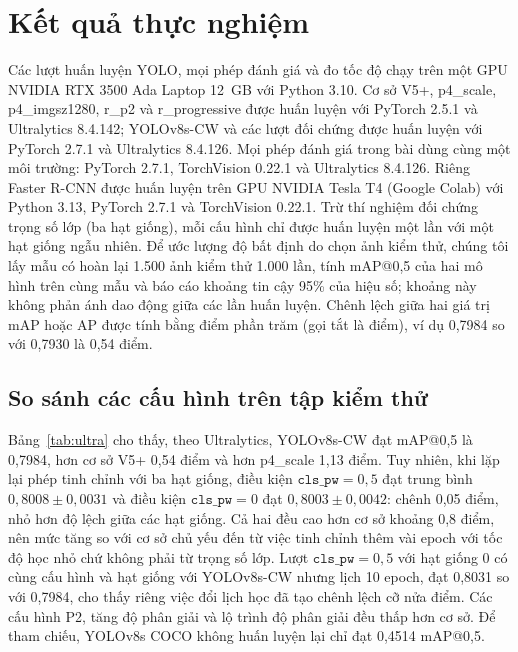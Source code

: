 \documentclass[10pt,journal,a4paper]{IEEEtran}
\newcommand{\clspw}{\texttt{cls\_pw}}
\begin{document}
\section{Kết quả thực nghiệm}\label{sec:results}
Các lượt huấn luyện YOLO, mọi phép đánh giá và đo tốc độ chạy trên một GPU NVIDIA RTX 3500 Ada Laptop 12~GB với Python 3.10. Cơ sở V5+, p4\_scale, p4\_imgsz1280, r\_p2 và r\_progressive được huấn luyện với PyTorch 2.5.1 và Ultralytics 8.4.142; YOLOv8s-CW và các lượt đối chứng được huấn luyện với PyTorch 2.7.1 và Ultralytics 8.4.126. Mọi phép đánh giá trong bài dùng cùng một môi trường: PyTorch 2.7.1, TorchVision 0.22.1 và Ultralytics 8.4.126. Riêng Faster R-CNN được huấn luyện trên GPU NVIDIA Tesla T4 (Google Colab) với Python 3.13, PyTorch 2.7.1 và TorchVision 0.22.1. Trừ thí nghiệm đối chứng trọng số lớp (ba hạt giống), mỗi cấu hình chỉ được huấn luyện một lần với một hạt giống ngẫu nhiên. Để ước lượng độ bất định do chọn ảnh kiểm thử, chúng tôi lấy mẫu có hoàn lại 1.500 ảnh kiểm thử 1.000 lần, tính mAP@0,5 của hai mô hình trên cùng mẫu và báo cáo khoảng tin cậy 95\% của hiệu số; khoảng này không phản ánh dao động giữa các lần huấn luyện. Chênh lệch giữa hai giá trị mAP hoặc AP được tính bằng điểm phần trăm (gọi tắt là điểm), ví dụ 0,7984 so với 0,7930 là 0,54 điểm.

\subsection{So sánh các cấu hình trên tập kiểm thử}
Bảng~\ref{tab:ultra} cho thấy, theo Ultralytics, YOLOv8s-CW đạt mAP@0,5 là 0,7984, hơn cơ sở V5+ 0,54 điểm và hơn p4\_scale 1,13 điểm. Tuy nhiên, khi lặp lại phép tinh chỉnh với ba hạt giống, điều kiện $\clspw = 0{,}5$ đạt trung bình $0{,}8008 \pm 0{,}0031$ và điều kiện $\clspw = 0$ đạt $0{,}8003 \pm 0{,}0042$: chênh 0,05 điểm, nhỏ hơn độ lệch giữa các hạt giống. Cả hai đều cao hơn cơ sở khoảng 0,8 điểm, nên mức tăng so với cơ sở chủ yếu đến từ việc tinh chỉnh thêm vài epoch với tốc độ học nhỏ chứ không phải từ trọng số lớp. Lượt $\clspw = 0{,}5$ với hạt giống 0 có cùng cấu hình và hạt giống với YOLOv8s-CW nhưng lịch 10 epoch, đạt 0,8031 so với 0,7984, cho thấy riêng việc đổi lịch học đã tạo chênh lệch cỡ nửa điểm. Các cấu hình P2, tăng độ phân giải và lộ trình độ phân giải đều thấp hơn cơ sở. Để tham chiếu, YOLOv8s COCO không huấn luyện lại chỉ đạt 0,4514 mAP@0,5.
\end{document}
